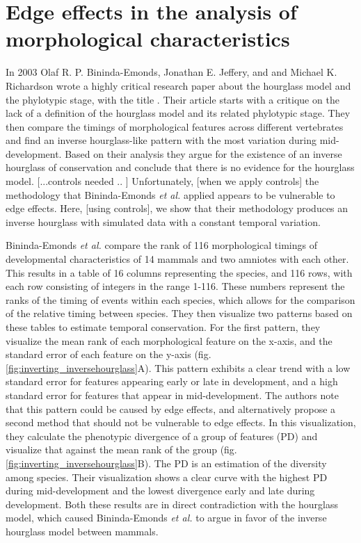 \chapter{Edge effects in the analysis of morphological characteristics}\thumbforchapter
\newpage

In 2003 Olaf R. P. Bininda-Emonds, Jonathan E. Jeffery, and and Michael K. Richardson wrote a highly critical research paper about the hourglass model and the phylotypic stage, with the title \cite{OlafRP2003}. Their article starts with a critique on the lack of a definition of the hourglass model and its related phylotypic stage. They then compare the timings of morphological features across different vertebrates and find an inverse hourglass-like pattern with the most variation during mid-development. Based on their analysis they argue for the existence of an inverse hourglass of conservation and conclude that there is no evidence for the hourglass model. [...controls needed .. ] Unfortunately, [when we apply controls] the methodology that Bininda-Emonds \textit{et al.} applied appears to be vulnerable to edge effects. Here, [using controls], we show that their methodology produces an inverse hourglass with simulated data with a constant temporal variation.

Bininda-Emonds \textit{et al.} compare the rank of 116 morphological timings of developmental characteristics of 14 mammals and two amniotes with each other. This results in a table of 16 columns representing the species, and 116 rows, with each row consisting of integers in the range 1-116. These numbers represent the ranks of the timing of events within each species, which allows for the comparison of the relative timing between species. They then visualize two patterns based on these tables to estimate temporal conservation. For the first pattern, they visualize the mean rank of each morphological feature on the x-axis, and the standard error of each feature on the y-axis (fig. \ref{fig:inverting_inversehourglass}A). This pattern exhibits a clear trend with a low standard error for features appearing early or late in development, and a high standard error for features that appear in mid-development. The authors note that this pattern could be caused by edge effects, and alternatively propose a second method that should not be vulnerable to edge effects. In this visualization, they calculate the phenotypic divergence of a group of features (PD) and visualize that against the mean rank of the group (fig. \ref{fig:inverting_inversehourglass}B). The PD is an estimation of the diversity among species. Their visualization shows a clear curve with the highest PD during mid-development and the lowest divergence early and late during development. Both these results are in direct contradiction with the hourglass model, which caused Bininda-Emonds \textit{et al.} to argue in favor of the inverse hourglass model between mammals.

